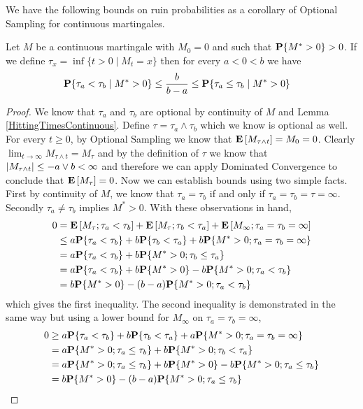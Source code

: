 We have the following bounds on ruin probabilities as a corollary of Optional Sampling for continuous martingales.
\begin{lem}\label{GamblersRuinContinuousMartingale}Let $M$ be a continuous martingale with $M_0 = 0$ and such that $\probability{M^* > 0} > 0$.  If we define $\tau_x = \inf \lbrace t>0 \mid M_t = x\rbrace$ then for every $a < 0 < b$ we have
\begin{align*}
\cprobability{M^* > 0}{\tau_a < \tau_b} &\leq \frac{b}{b-a} \leq \cprobability{M^* > 0}{\tau_a \leq \tau_b} 
\end{align*}
\end{lem}
\begin{proof}We know that $\tau_a$ and $\tau_b$ are optional by continuity of $M$ and Lemma \ref{HittingTimesContinuous}.  Define $\tau = \tau_a \wedge \tau_b$ which we know is optional as well.  For every $t \geq 0$, by Optional Sampling we know that $\expectation{M_{\tau \wedge t}} = M_0 = 0$.  Clearly $\lim_{t \to \infty} M_{\tau \wedge t} = M_\tau$ and by the definition of $\tau$ we know that $\abs{M_{\tau \wedge t}} \leq -a \vee b < \infty$ and therefore we can apply Dominated Convergence to conclude that $\expectation{M_\tau} = 0$.  Now we can establish bounds using two simple facts.   First by continuity of $M$, we know that $\tau_a = \tau_b$ if and only if $\tau_a = \tau_b = \tau = \infty$.   Secondly $\tau_a \neq \tau_b$ implies $M^* > 0$.  With these observations in hand,
\begin{align*}
0 &=\expectation{M_\tau; \tau_a < \tau_b} + \expectation{M_\tau; \tau_b < \tau_a} + \expectation{M_\infty; \tau_a = \tau_b =\infty} \\
&\leq a \probability{\tau_a < \tau_b} + b \probability{\tau_b < \tau_a} + b \probability{M^* > 0 ; \tau_a = \tau_b =\infty} \\
&= a \probability{\tau_a < \tau_b} + b \probability{M^* > 0 ; \tau_b \leq \tau_a} \\
&= a \probability{\tau_a < \tau_b} + b \probability{M^* > 0} - b \probability{M^* > 0 ; \tau_a < \tau_b} \\
&= b \probability{M^* > 0} - (b - a)\probability{M^* > 0 ; \tau_a < \tau_b} \\
\end{align*}
which gives the first inequality. The second inequality is demonstrated in the same way but using a lower bound for $M_\infty$ on $\tau_a = \tau_b = \infty$, 
\begin{align*}
0 &\geq a \probability{\tau_a < \tau_b} + b \probability{\tau_b < \tau_a} + a \probability{M^* > 0 ; \tau_a = \tau_b =\infty} \\
&= a \probability{M^* > 0; \tau_a \leq \tau_b} + b \probability{M^* > 0 ; \tau_b < \tau_a} \\
&= a \probability{M^* > 0; \tau_a \leq \tau_b} + b \probability{M^* > 0} - b \probability{M^* > 0 ; \tau_a \leq \tau_b} \\
&= b \probability{M^* > 0} - (b - a)\probability{M^* > 0; \tau_a \leq \tau_b} \\
\end{align*}
\end{proof}

